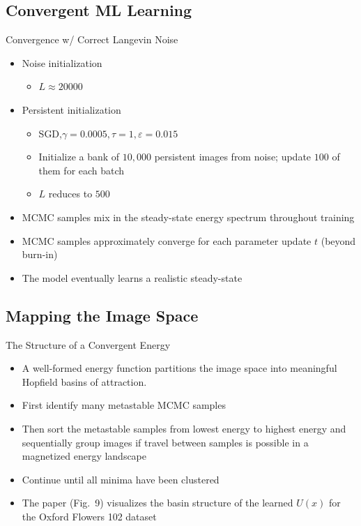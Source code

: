 \documentclass{beamer}
\begin{document}
\subsection{Convergent ML Learning}

\begin{frame}{Convergence w/ Correct Langevin Noise}
\begin{itemize}
\item Noise initialization
\begin{itemize}
\item $L\approx 20000$
\end{itemize}
\item Persistent initialization
\begin{itemize}
\item SGD,$\gamma=0.0005,\tau=1,\varepsilon=0.015$
\item Initialize a bank of $10{,}000$ persistent images from noise; update $100$ of them for each batch
\item $L$ reduces to $500$
\end{itemize}
\item MCMC samples mix in the steady-state energy spectrum throughout training
\item MCMC samples approximately converge for each parameter update $t$ (beyond burn-in)
\item The model eventually learns a realistic steady-state
\end{itemize}
\end{frame}

\subsection{Mapping the Image Space}
\begin{frame}{The Structure of a Convergent Energy}
\begin{itemize}
\item A well-formed energy function partitions the image space
into meaningful Hopfield basins of attraction.
\item First identify many
metastable MCMC samples
\item Then sort the metastable
samples from lowest energy to highest energy and sequentially
group images if travel between samples is possible in a
magnetized energy landscape
\item Continue until
all minima have been clustered
\item The paper (Fig.~9) visualizes the basin structure of the learned $U(x)$ for the Oxford Flowers 102 dataset
\end{itemize}
\end{frame}
\end{document}
